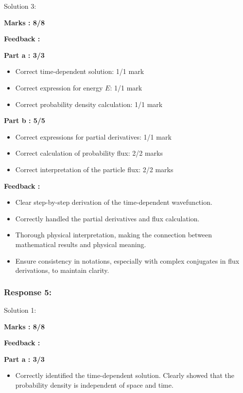 \documentclass[a4paper,11pt]{article}
\begin{document}
Solution 3:

\textbf{Marks : 8/8}

\textbf{Feedback : }

\textbf{Part a : 3/3}

\begin{itemize}
    \item Correct time-dependent solution: 1/1 mark
    \item Correct expression for energy $E$: 1/1 mark
    \item Correct probability density calculation: 1/1 mark
\end{itemize}


\textbf{Part b : 5/5}

\begin{itemize}
    \item Correct expressions for partial derivatives: 1/1 mark
    \item Correct calculation of probability flux: 2/2 marks
    \item Correct interpretation of the particle flux: 2/2 marks
\end{itemize}


\textbf{Feedback :}

\begin{itemize}
    \item Clear step-by-step derivation of the time-dependent wavefunction.
    \item Correctly handled the partial derivatives and flux calculation.
    \item Thorough physical interpretation, making the connection between mathematical results and physical meaning.
    \item Ensure consistency in notations, especially with complex conjugates in flux derivations, to maintain clarity.
\end{itemize}



\subsubsection*{Response 5:}

Solution 1:

\textbf{Marks : 8/8}

\textbf{Feedback : }

\textbf{Part a : 3/3}

\begin{itemize}
    \item Correctly identified the time-dependent solution. Clearly showed that the probability density is independent of space and time.
\end{itemize}
\end{document}
